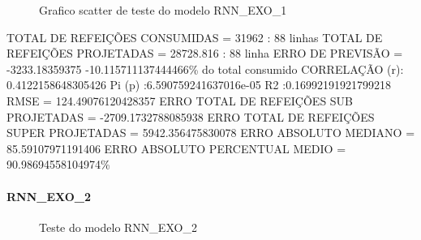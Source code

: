 \documentclass[	12pt, Times, openright, twoside, a4paper, english, brazil]{abntex2}
\begin{document}
                \begin{figure}[!ht]
                  \caption{Grafico scatter de teste do modelo RNN\_EXO\_1 \label{fig:case1_rnn_exo_1_test_scatter} }
                \end{figure}
                TOTAL DE REFEIÇÕES CONSUMIDAS = 31962 : 88 linhas \newline
                TOTAL DE REFEIÇÕES PROJETADAS = 28728.816 : 88 linha \newline
                ERRO DE PREVISÃO = -3233.18359375 -10.115711137444466\% do total consumido\newline
                CORRELAÇÃO (r): 0.4122158648305426 Pi (p) :6.590759241637016e-05 R2 :0.16992191921799218\newline
                RMSE = 124.49076120428357\newline
                ERRO TOTAL DE REFEIÇÕES SUB PROJETADAS = -2709.1732788085938\newline
                ERRO TOTAL DE REFEIÇÕES SUPER PROJETADAS = 5942.356475830078\newline
                ERRO ABSOLUTO MEDIANO = 85.59107971191406\newline
                ERRO ABSOLUTO PERCENTUAL MEDIO = 90.98694558104974\%\newline
              \paragraph{RNN\_EXO\_2}
                \begin{figure}[!ht]
                  \caption{Teste do modelo RNN\_EXO\_2 \label{fig:case2_rnn_exo_2_test} }
                \end{figure}
\end{document}
